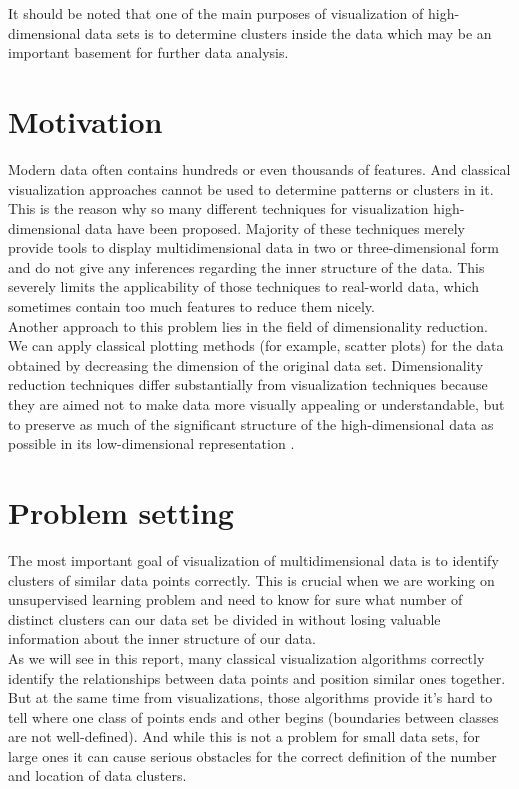 It should be noted that one of the main purposes of visualization of high-dimensional data sets is to determine clusters inside the data which may be an important basement for further data analysis.


\section{Motivation}

Modern data often contains hundreds or even thousands of features. And classical visualization approaches cannot be used to determine patterns or clusters in it. This is the reason why so many different techniques for visualization high-dimensional data have been proposed. Majority of these techniques merely provide tools to display multidimensional data in two or three-dimensional form and do not give any inferences regarding the inner structure of the data. This severely limits the applicability of those techniques to real-world data, which sometimes contain too much features to reduce them nicely.\\

Another approach to this problem lies in the field of dimensionality reduction. We can apply classical plotting methods (for example, scatter plots) for the data obtained by decreasing the dimension of the original data set. Dimensionality reduction techniques differ substantially from visualization techniques because they are aimed not to make data more visually appealing or understandable, but to preserve as much of the significant structure of the high-dimensional data as possible in its low-dimensional representation \cite{tsnearticle}.

\section{Problem setting}

The most important goal of visualization of multidimensional data is to identify clusters of similar data points correctly. This is crucial when we are working on unsupervised learning problem and need to know for sure what number of distinct clusters can our data set be divided in without losing valuable information about the inner structure of our data.\\

As we will see in this report, many classical visualization algorithms correctly identify the relationships between data points and position similar ones together. But at the same time from visualizations, those algorithms provide it's hard to tell where one class of points ends and other begins (boundaries between classes are not well-defined). And while this is not a problem for small data sets, for large ones it can cause serious obstacles for the correct definition of the number and location of data clusters. \\

